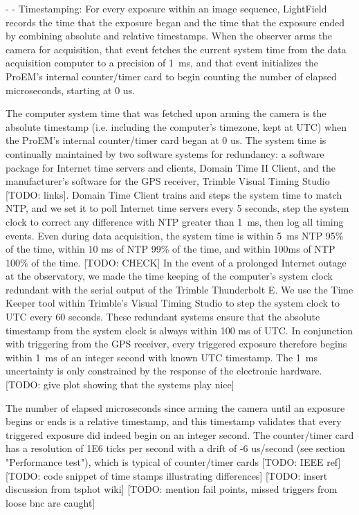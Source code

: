 \documentclass[preprint2]{aastex}
\begin{document}
- - Timestamping: For every exposure within an image sequence, LightField records the time that the exposure began and the time that the exposure ended by combining absolute and relative timestamps. When the observer arms the camera for acquisition, that event fetches the current system time from the data acquisition computer to a precision of 1~ms, and that event initializes the ProEM's internal counter/timer card to begin counting the number of elapsed microseconds, starting at 0 us.

The computer system time that was fetched upon arming the camera is the absolute timestamp (i.e. including the computer's timezone, kept at UTC) when the  ProEM's internal counter/timer card began at 0 us. The system time is continually maintained by two software systems for redundancy: a software package for Internet time servers and clients, Domain Time II Client, and the manufacturer's software for the GPS receiver, Trimble Visual Timing Studio [TODO: links]. Domain Time Client trains and steps the system time to match NTP, and we set it to poll Internet time servers every 5 seconds, step the system clock to correct any difference with NTP greater than 1~ms, then log all timing events. Even during data acquisition, the system time is within 5~ms NTP 95\% of the time, within 10 ms of NTP 99\% of the time, and within 100ms of NTP 100\% of the time. [TODO: CHECK] In the event of a prolonged Internet outage at the observatory, we made the time keeping of the computer's system clock redundant with the serial output of the Trimble Thunderbolt E. We use the Time Keeper tool within Trimble's Visual Timing Studio to step the system clock to UTC every 60 seconds. These redundant systems ensure that the absolute timestamp from the system clock is always within 100 ms of UTC. In conjunction with triggering from the GPS receiver, every triggered exposure therefore begins within 1~ms of an integer second with known UTC timestamp. The 1~ms uncertainty is only constrained by the response of the electronic hardware. [TODO: give plot showing that the systems play nice]

The number of elapsed microseconds since arming the camera until an exposure begins or ends is a relative timestamp, and this timestamp validates that every triggered exposure did indeed begin on an integer second. The counter/timer card has a resolution of 1E6 ticks per second with a drift of -6 us/second (see section "Performance test"), which is typical of counter/timer cards [TODO: IEEE ref] [TODO: code snippet of time stamps illustrating differences] [TODO: insert discussion from tsphot wiki] [TODO: mention fail points, missed triggers from loose bnc are caught]
\end{document}
